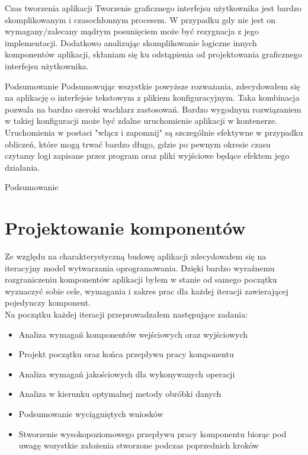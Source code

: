 \documentclass[a4paper,12pt,twoside,openany]{report}
\begin{document}
    \begin{subsection}{Czas tworzenia aplikacji}
      Tworzenie graficznego interfejsu użytkownika jest bardzo skomplikowanym i czasochłonnym procesem. W przypadku gdy nie jest on wymagany/zalecany 
      mądrym posunięciem może być rezygnacja z jego implementacji. Dodatkowo analizując skomplikowanie logiczne innych komponentów aplikacji, skłaniam się 
      ku odstąpienia od projektowania graficznego interfejsu użytkownika.
    \end{subsection}

    \begin{subsection}{Podsumowanie}
      Podsumowując wszystkie powyższe rozważania, zdecydowałem się na aplikację o interfejsie tekstowym z plikiem konfiguracyjnym.
      Taka kombinacja pozwala na bardzo szeroki wachlarz zastosowań. Bardzo wygodnym rozwiązaniem w takiej konfiguracji może być 
      zdalne uruchomienie aplikacji w kontenerze. Uruchomienia w postaci "włącz i zapomnij" są szczególnie efektywne w przypadku 
      obliczeń, które mogą trwać bardzo długo, gdzie po pewnym okresie czasu czytamy logi zapisane przez program oraz pliki wyjściowe będące efektem jego działania.      
    \end{subsection}{Podsumowanie}



  \section{Projektowanie komponentów}
    Ze względu na charakterystyczną budowę aplikacji zdecydowałem się na iteracyjny model wytwarzania oprogramowania.
    Dzięki bardzo wyraźnemu rozgraniczeniu komponentów aplikacji byłem w stanie od samego początku
    wyznaczyć sobie cele, wymagania i zakres prac dla każdej iteracji zawierającej pojedynczy komponent.
    \\
    Na początku każdej iteracji przeprowadzałem następujące zadania:
    \begin{itemize}
      \item Analiza wymagań komponentów wejściowych oraz wyjściowych
      \item Projekt początku oraz końca przepływu pracy komponentu
      \item Analiza wymagań jakościowych dla wykonywanych operacji
      \item Analiza w kierunku optymalnej metody obróbki danych
      \item Podsumowanie wyciągniętych wniosków
      \item Stworzenie wysokopoziomowego przepływu pracy komponentu biorąc pod uwagę wszystkie założenia stworzone podczas poprzednich kroków
    \end{itemize}
\end{document}
